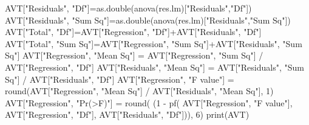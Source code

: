 \documentclass[
]{article}
\newenvironment{Shaded}{\begin{snugshade}}{\end{snugshade}}
\newcommand{\DecValTok}[1]{\textcolor[rgb]{0.00,0.00,0.81}{#1}}
\newcommand{\FunctionTok}[1]{\textcolor[rgb]{0.00,0.00,0.00}{#1}}
\newcommand{\NormalTok}[1]{#1}
\newcommand{\OtherTok}[1]{\textcolor[rgb]{0.56,0.35,0.01}{#1}}
\newcommand{\SpecialCharTok}[1]{\textcolor[rgb]{0.00,0.00,0.00}{#1}}
\newcommand{\StringTok}[1]{\textcolor[rgb]{0.31,0.60,0.02}{#1}}
\begin{document}
\begin{Shaded}
\begin{Highlighting}[]
\NormalTok{AVT[}\StringTok{"Residuals"}\NormalTok{, }\StringTok{"Df"}\NormalTok{]}\OtherTok{=}\FunctionTok{as.double}\NormalTok{(}\FunctionTok{anova}\NormalTok{(res.lm)[}\StringTok{"Residuals"}\NormalTok{,}\StringTok{"Df"}\NormalTok{])}
\NormalTok{AVT[}\StringTok{"Residuals"}\NormalTok{, }\StringTok{"Sum Sq"}\NormalTok{]}\OtherTok{=}\FunctionTok{as.double}\NormalTok{(}\FunctionTok{anova}\NormalTok{(res.lm)[}\StringTok{"Residuals"}\NormalTok{,}\StringTok{"Sum Sq"}\NormalTok{])}
\NormalTok{AVT[}\StringTok{"Total"}\NormalTok{, }\StringTok{"Df"}\NormalTok{]}\OtherTok{=}\NormalTok{AVT[}\StringTok{"Regression"}\NormalTok{, }\StringTok{"Df"}\NormalTok{]}\SpecialCharTok{+}\NormalTok{AVT[}\StringTok{"Residuals"}\NormalTok{, }\StringTok{"Df"}\NormalTok{]}
\NormalTok{AVT[}\StringTok{"Total"}\NormalTok{, }\StringTok{"Sum Sq"}\NormalTok{]}\OtherTok{=}\NormalTok{AVT[}\StringTok{"Regression"}\NormalTok{, }\StringTok{"Sum Sq"}\NormalTok{]}\SpecialCharTok{+}\NormalTok{AVT[}\StringTok{"Residuals"}\NormalTok{, }\StringTok{"Sum Sq"}\NormalTok{]}
\NormalTok{AVT[}\StringTok{"Regression"}\NormalTok{, }\StringTok{"Mean Sq"}\NormalTok{] }\OtherTok{=}\NormalTok{ AVT[}\StringTok{"Regression"}\NormalTok{, }\StringTok{"Sum Sq"}\NormalTok{] }\SpecialCharTok{/}\NormalTok{ AVT[}\StringTok{"Regression"}\NormalTok{, }\StringTok{"Df"}\NormalTok{]}
\NormalTok{AVT[}\StringTok{"Residuals"}\NormalTok{, }\StringTok{"Mean Sq"}\NormalTok{] }\OtherTok{=}\NormalTok{ AVT[}\StringTok{"Residuals"}\NormalTok{, }\StringTok{"Sum Sq"}\NormalTok{] }\SpecialCharTok{/}\NormalTok{ AVT[}\StringTok{"Residuals"}\NormalTok{, }\StringTok{"Df"}\NormalTok{]}
\NormalTok{AVT[}\StringTok{"Regression"}\NormalTok{, }\StringTok{"F value"}\NormalTok{] }\OtherTok{=} 
  \FunctionTok{round}\NormalTok{(AVT[}\StringTok{"Regression"}\NormalTok{, }\StringTok{"Mean Sq"}\NormalTok{] }\SpecialCharTok{/}\NormalTok{ AVT[}\StringTok{"Residuals"}\NormalTok{, }\StringTok{"Mean Sq"}\NormalTok{], }\DecValTok{1}\NormalTok{)}
\NormalTok{AVT[}\StringTok{"Regression"}\NormalTok{, }\StringTok{"Pr(\textgreater{}F)"}\NormalTok{] }\OtherTok{=} 
  \FunctionTok{round}\NormalTok{( (}\DecValTok{1} \SpecialCharTok{{-}} \FunctionTok{pf}\NormalTok{( AVT[}\StringTok{"Regression"}\NormalTok{, }\StringTok{"F value"}\NormalTok{],}
\NormalTok{                AVT[}\StringTok{"Regression"}\NormalTok{, }\StringTok{"Df"}\NormalTok{],}
\NormalTok{                AVT[}\StringTok{"Residuals"}\NormalTok{, }\StringTok{"Df"}\NormalTok{])), }
        \DecValTok{6}\NormalTok{)}
\FunctionTok{print}\NormalTok{(AVT)}
\end{Highlighting}
\end{Shaded}
\end{document}
